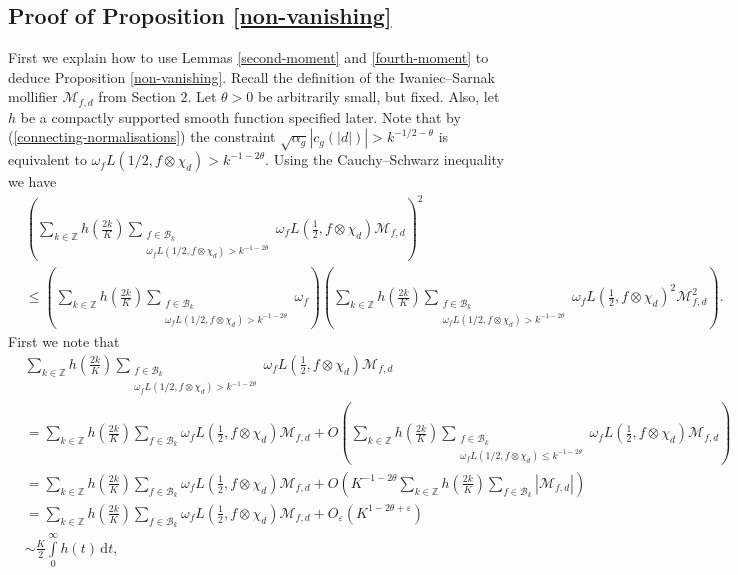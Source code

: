 \documentclass[a4paper,10pt,twoside]{amsart}
\theoremstyle{definition}
\numberwithin{equation}{section}
\newcommand\Z{\mathbb{Z}}
\newcommand\eps{\varepsilon}
\renewcommand\:{\colon}
\begin{document}
\subsection{Proof of Proposition \ref{non-vanishing}}
\noindent First we explain how to use Lemmas \ref{second-moment} and \ref{fourth-moment} to deduce Proposition \ref{non-vanishing}. Recall the definition of the Iwaniec--Sarnak mollifier $\mathcal M_{f,d}$ from Section $2$. Let $\theta>0$ be arbitrarily small, but fixed. Also, let $h$ be a compactly supported smooth function specified later. Note that by (\ref{connecting-normalisations}) the constraint $\sqrt{\alpha_g}|c_g(|d|)|> k^{-1/2-\theta}$ is equivalent to $\omega_f L(1/2,f\otimes\chi_d)> k^{-1-2\theta}$. Using the Cauchy--Schwarz inequality we have 
\begin{align*}
&\left(\sum_{k\in\Z}h\left(\frac{2k}K\right)\sum_{\substack{f\in \mathcal B_k\\
\omega_f L(1/2,f\otimes\chi_d)> k^{-1-2\theta}}}
\omega_f L\left(\frac12,f\otimes\chi_{d}\right)\mathcal M_{f,d}\right)^2\\
&\leq\left(\sum_{k\in\Z}h\left(\frac{2k}K\right)\sum_{\substack{f\in\mathcal B_k\\
\omega_f L(1/2,f\otimes\chi_d)> k^{-1-2\theta}}}
 \omega_f\right)\left(\sum_{k\in\Z}h\left(\frac{2k}K\right)\sum_{\substack{f\in\mathcal B_k\\
\omega_f L(1/2,f\otimes\chi_d)> k^{-1-2\theta}}}\omega_f L\left(\frac12,f\otimes\chi_{d}\right)^2\mathcal M_{f,d}^2 \right).
\end{align*}
First we note that 
\begin{align*}
&\sum_{k\in\Z}h\left(\frac{2k}K\right)\sum_{\substack{f\in \mathcal B_k\\
\omega_f L(1/2,f\otimes\chi_d)> k^{-1-2\theta}}}
\omega_f L\left(\frac12,f\otimes\chi_{d}\right)\mathcal M_{f,d}\\
&=\sum_{k\in\Z}h\left(\frac{2k}K\right)\sum_{f\in \mathcal B_k}
\omega_f L\left(\frac12,f\otimes\chi_{d}\right)\mathcal M_{f,d}+O\left(\sum_{k\in\Z}h\left(\frac{2k}K\right)\sum_{\substack{f\in \mathcal B_k\\
\omega_f L(1/2,f\otimes\chi_d)\leq k^{-1-2\theta}}}
\omega_f L\left(\frac12,f\otimes\chi_{d}\right)\mathcal M_{f,d}\right)\\
&=\sum_{k\in\Z}h\left(\frac{2k}K\right)\sum_{f\in \mathcal B_k}
\omega_f L\left(\frac12,f\otimes\chi_{d}\right)\mathcal M_{f,d}+O\left(K^{-1-2\theta}\sum_{k\in\Z}h\left(\frac{2k}K\right)\sum_{f\in\mathcal B_k}|\mathcal M_{f,d}|\right)\\
&=\sum_{k\in\Z}h\left(\frac{2k}K\right)\sum_{f\in \mathcal B_k}
\omega_f L\left(\frac12,f\otimes\chi_{d}\right)\mathcal M_{f,d}+O_\eps\left(K^{1-2\theta+\eps}\right)\\
&\sim \frac K2\int\limits_0^\infty h(t)\,\mathrm d t,
\end{align*}
\end{document}
